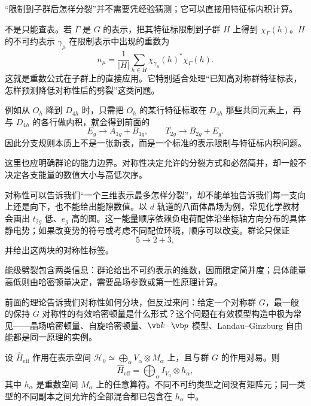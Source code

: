 “限制到子群后怎样分裂”并不需要凭经验猜测；它可以直接用特征标内积计算。

 不是只能查表。若 $\Gamma$ 是 $G$ 的表示，把其特征标限制到子群 $H$ 上得到 $\chi_\Gamma(h)$。$H$ 的不可约表示 $\gamma_\mu$ 在限制表示中出现的重数为
\[
n_\mu
=\frac1{|H|}
\sum_{h\in H}
\chi_{\gamma_\mu}(h)^*\chi_\Gamma(h).
\label{eq:branching-multiplicity}
\]
这就是重数公式在子群上的直接应用。它特别适合处理“已知高对称群特征标表，怎样预测降低对称性后的劈裂”这类问题。

例如从 $O_h$ 降到 $D_{4h}$ 时，只需把 $O_h$ 的某行特征标取在 $D_{4h}$ 那些共同元素上，再与 $D_{4h}$ 的各行做内积，就会得到前面的
\[
E_g\to A_{1g}+B_{1g},
\qquad
T_{2g}\to B_{2g}+E_g.
\]
因此分支规则本质上不是一张新表，而是一个标准的表示限制与特征标内积问题。

这里也应明确群论的能力边界。对称性决定允许的分裂方式和必然简并，却一般不决定各支能量的数值大小与高低次序。

对称性可以告诉我们“一个三维表示最多怎样分裂”，却不能单独告诉我们每一支向上还是向下，也不能给出能隙数值。以 $d$ 轨道的八面体晶场为例，常见化学教材会画出 $t_{2g}$ 低、$e_g$ 高的图。这一能量顺序依赖负电荷配体沿坐标轴方向分布的具体静电势；如果改变势的符号或考虑不同配位环境，顺序可以改变。群论只保证
\[
5\longrightarrow2+3,
\]
并给出这两块的对称性标签。

能级劈裂包含两类信息：群论给出不可约表示的维数，因而限定简并度；具体能量高低则由哈密顿量决定，需要晶场参数或第一性原理计算。

前面的理论告诉我们对称性如何分块，但反过来问：给定一个对称群 $G$，最一般的保持 $G$ 对称性的有效哈密顿量是什么形式？这个问题在有效模型构造中极为常见——晶场哈密顿量、自旋哈密顿量、$\vb k\cdot\vb p$ 模型、Landau--Ginzburg 自由能都是同一原理的实例。

\begin{theorem}[对称性约束下的有效哈密顿量一般形式]
设 $\hat H_{\mathrm{eff}}$ 作用在表示空间 $\mathcal H_0\simeq\bigoplus_\alpha V_\alpha\otimes M_\alpha$ 上，且与群 $G$ 的作用对易。则
\begin{equation}
\hat H_{\mathrm{eff}}
=\bigoplus_\alpha I_{V_\alpha}\otimes h_\alpha,
\label{eq:effective-hamiltonian-general}
\end{equation}
其中 $h_\alpha$ 是重数空间 $M_\alpha$ 上的任意算符。不同不可约类型之间没有矩阵元；同一类型的不同副本之间允许的全部混合都已包含在 $h_\alpha$ 中。
\label{thm:effective-hamiltonian-form}
\end{theorem}

